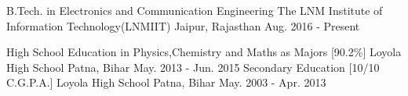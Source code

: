 

\begin{cventries}

  \cventry
    {B.Tech. in Electronics and Communication Engineering} %
    {The LNM Institute of Information Technology(LNMIIT)} %
    {Jaipur, Rajasthan} %
    {Aug. 2016 - Present} %
    {
    }

	\cventry
    {High School Education in Physics,Chemistry and Maths as Majors [90.2\%]} %
    {Loyola High School} %
    {Patna, Bihar} %
    {May. 2013 - Jun. 2015} %
    {
    }
		\cventry
    {Secondary Education [10/10 C.G.P.A.]} %
    {Loyola High School} %
    {Patna, Bihar} %
    {May. 2003 - Apr. 2013} %
    {
    }

\end{cventries}


